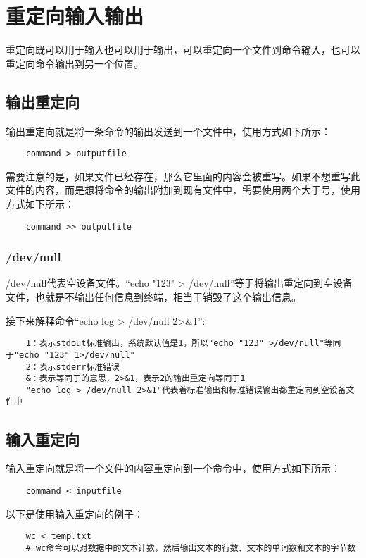 \documentclass[a4paper,left=1.5cm,right=1.5cm,11pt]{article}
\begin{document}
\section{重定向输入输出}
	重定向既可以用于输入也可以用于输出，可以重定向一个文件到命令输入，也可以重定向命令输出到另一个位置。

\subsection{输出重定向}
	输出重定向就是将一条命令的输出发送到一个文件中，使用方式如下所示：
	\begin{lstlisting}
	command > outputfile
	\end{lstlisting}

	需要注意的是，如果文件已经存在，那么它里面的内容会被重写。如果不想重写此文件的内容，而是想将命令的输出附加到现有文件中，需要使用两个大于号，使用方式如下所示：
	\begin{lstlisting}
	command >> outputfile
	\end{lstlisting}

\subsubsection{/dev/null}
	/dev/null代表空设备文件。“echo "123" > /dev/null”等于将输出重定向到空设备文件，也就是不输出任何信息到终端，相当于销毁了这个输出信息。\par

	接下来解释命令“echo log > /dev/null 2>\&1”:
	\begin{lstlisting}
	1：表示stdout标准输出，系统默认值是1，所以"echo "123" >/dev/null"等同于"echo "123" 1>/dev/null"
	2：表示stderr标准错误
	&：表示等同于的意思，2>&1，表示2的输出重定向等同于1
	"echo log > /dev/null 2>&1"代表着标准输出和标准错误输出都重定向到空设备文件中
	\end{lstlisting}

\subsection{输入重定向}
	输入重定向就是将一个文件的内容重定向到一个命令中，使用方式如下所示：
	\begin{lstlisting}
	command < inputfile
	\end{lstlisting}

	以下是使用输入重定向的例子：
	\begin{lstlisting}
	wc < temp.txt
	# wc命令可以对数据中的文本计数，然后输出文本的行数、文本的单词数和文本的字节数
	\end{lstlisting}
\end{document}
